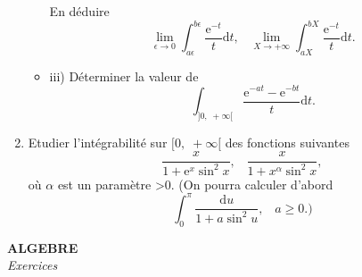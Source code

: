 \documentclass[12pt,a4paper]{article}
\begin{document}
\begin{enumerate}
\begin{itemize}
 En déduire $$\lim_{\epsilon\rightarrow
    0}\int_{a\epsilon}^{b\epsilon}\frac{\mbox{e}^{-t}}{t}\mbox{d}t,\;\;\;\lim_
  { X\rightarrow
    +\infty}\int_{aX}^{bX}\frac{\mbox{e}^{-t}}{t}\mbox{d}t.$$
\item iii) Déterminer la valeur de $$\int_{]0,\;+\infty
    [}\frac{\mbox{e}^{-at}-\mbox{e}^{-bt}}{t}\mbox{d}t.$$
\end{itemize}
\item Etudier l'intégrabilité sur $[0,\; +\infty [$ des fonctions
  suivantes
$$ \frac{x}{1+\mbox{e}^x\sin^2x},\;\;\;\frac{x}{1+x^\alpha\sin^2x},$$
où $\alpha$ est un paramètre >0. (On pourra calculer d'abord
$$\int_0^\pi\frac{\mbox{d}u}{1+a\sin^2u},\;\;\; a\geq 0.)$$
\end{enumerate}

\begin{center}
{\bf ALGEBRE}\\
{\it Exercices}
\end{center}
\end{document}
